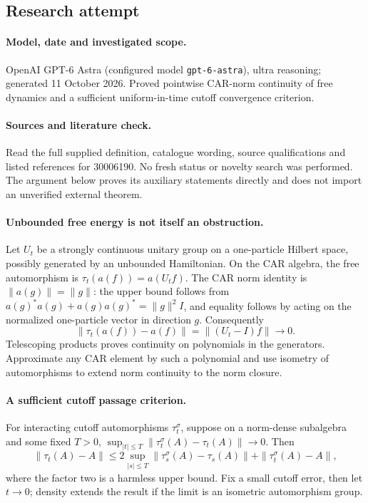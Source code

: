 \documentclass[11pt]{article}
\begin{document}
\subsection{Research attempt}
\paragraph{Model, date and investigated scope.}
OpenAI GPT-6 Astra (configured model \texttt{gpt-6-astra}), ultra reasoning; generated 11 October 2026. Proved pointwise CAR-norm continuity of free dynamics and a sufficient uniform-in-time cutoff convergence criterion.

\paragraph{Sources and literature check.}
Read the full supplied definition, catalogue wording, source qualifications and listed references for 30006190. No fresh status or novelty search was performed. The argument below proves its auxiliary statements directly and does not import an unverified external theorem.

\paragraph{Unbounded free energy is not itself an obstruction.} Let \(U_t\) be a strongly continuous unitary group on a one-particle Hilbert space, possibly generated by an unbounded Hamiltonian. On the CAR algebra, the free automorphism is \(\tau_t(a(f))=a(U_tf)\). The CAR norm identity is \(\|a(g)\|=\|g\|\): the upper bound follows from \(a(g)^*a(g)+a(g)a(g)^*=\|g\|^2I\), and equality follows by acting on the normalized one-particle vector in direction \(g\). Consequently
\[
 \|\tau_t(a(f))-a(f)\|=\|(U_t-I)f\|\longrightarrow0.
\]
Telescoping products proves continuity on polynomials in the generators. Approximate any CAR element by such a polynomial and use isometry of automorphisms to extend norm continuity to the norm closure.
\paragraph{A sufficient cutoff passage criterion.} For interacting cutoff automorphisms \(\tau_t^\sigma\), suppose on a norm-dense subalgebra and some fixed \(T>0\), \(\sup_{|t|\leq T}\|\tau_t^\sigma(A)-\tau_t(A)\|\to0\). Then
\[
 \|\tau_t(A)-A\|\leq
 2\sup_{|s|\leq T}\|\tau_s^\sigma(A)-\tau_s(A)\|
 +\|\tau_t^\sigma(A)-A\|,
\]
where the factor two is a harmless upper bound. Fix a small cutoff error, then let \(t\to0\); density extends the result if the limit is an isometric automorphism group.
\end{document}
